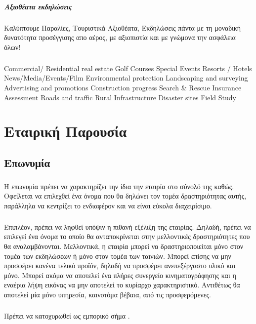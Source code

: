 \documentclass[a4paper, 12pt, twoside]{report}
\begin{document}
			\paragraph{Αξιοθέατα εκδηλώσεις}{Καλύπτουμε Παραλίες, Τουριστικά Αξιοθέατα, Εκδηλώσεις πάντα με τη μοναδική δυνατότητα προσέγγισης απο αέρος, με αξιοπιστία και με γνώμονα την ασφάλεια όλων! 
			}
			\paragraph{}{ Commercial/ Residential real estate
 Golf Courses
 Special Events
 Resorts / Hotels
 News/Media/Events/Film
 Environmental protection
 Landscaping and surveying
 Advertising and promotions
 Construction progress
 Search & Rescue
 Insurance Assessment
 Roads and traffic
 Rural Infrastructure
 Disaster sites
 Field Study
 }
			
	\chapter{Εταιρική Παρουσία}
	
		\section{Επωνυμία}
			\paragraph{}{Η επωνυμία πρέπει να χαρακτηρίζει την ίδια την εταιρία στο σύνολό της καθώς. Οφείλεται να επιλεχθεί ένα όνομα που θα δηλώνει τον τομέα δραστηριότητας αυτής, παράλληλα να κεντρίζει το ενδιαφέρον και να είναι εύκολα διαχειρίσιμο.
			}
			\paragraph{}{Επιπλέον, πρέπει να ληφθεί υπόψιν η πιθανή εξέλιξη της εταιρίας. Δηλαδή, πρέπει να επιλεγεί ένα όνομα το οποίο θα ανταποκρίνεται στην μελλοντικές δραστηριότητες που θα αναλαμβάνονται. Μελλοντικά, η εταιρία μπορεί να δραστηριοποιείται μόνο στον τομέα των εκδηλώσεων ή μόνο στον τομέα των ταινιών. Μπορεί επίσης να μην προσφέρει κανένα τελικό προϊόν, δηλαδή να προσφέρει ανεπεξέργαστο υλικό και μόνο. Μπορεί ακόμα να αποτελεί ένα πλήρες συνεργείο κινηματογράφησης και η εναέρια λήψη εικόνας να μην αποτελεί το κυρίαρχο χαρακτηριστικό. Αντιθέτως θα αποτελεί μία μόνο υπηρεσία, καινοτόμα βέβαια, από τις προσφερόμενες.
			}
			\paragraph{}{Πρέπει να κατοχυρωθεί ως εμπορικό σήμα \textregistered.
			}
			
\end{document}
